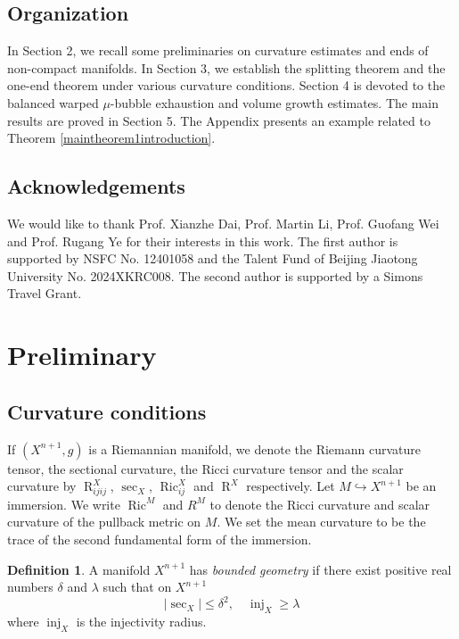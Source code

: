 \documentclass[11pt,letterpaper]{amsart}
\DeclareMathOperator{\inj}{inj}
\DeclareMathOperator{\Ric}{Ric}
\DeclareMathOperator{\R}{R}
\theoremstyle{definition}
\newtheorem{definition}[theorem]{Definition}
\theoremstyle{remark}
\numberwithin{equation}{section}
\begin{document}
\subsection{Organization}
In Section 2, we recall some preliminaries on curvature estimates and ends of non-compact manifolds. In Section 3, we establish the splitting theorem and the one-end theorem under various curvature conditions. Section 4 is devoted to the balanced warped $\mu$-bubble exhaustion and volume growth estimates. The main results are proved in Section 5. The Appendix presents an example related to Theorem \ref{maintheorem1introduction}.
\subsection{Acknowledgements}
We would like to thank Prof. Xianzhe Dai, Prof. Martin Li, Prof. Guofang Wei and Prof. Rugang Ye for their interests in this work. The first author is supported by NSFC No. 12401058 and the Talent Fund of Beijing Jiaotong University No. 2024XKRC008. The second author is supported by a Simons Travel Grant.


\section{Preliminary}
\subsection{Curvature conditions}
If $(X^{n+1},g)$ is a Riemannian manifold, we denote the Riemann curvature tensor, the sectional curvature, the Ricci curvature tensor and the scalar curvature by $\R^X_{ijij}$, $\sec_X$, $\Ric^X_{ij}$ and $\R^X$ respectively. Let $M\hookrightarrow X^{n+1}$ be an immersion. We write $\Ric^M$ and $R^M$ to denote the Ricci curvature and scalar curvature of the pullback metric on $M$. We set the mean curvature to be the trace of the second fundamental form of the immersion.
\begin{definition}
	A manifold $X^{n+1}$ has \textit{bounded geometry} if there exist positive real numbers $\delta$ and $\lambda$ such that on $X^{n+1}$
	\begin{equation*}
		|\sec_X|\leqslant \delta^2, \quad \inj_X\geqslant \lambda
	\end{equation*}
 where $\inj_X$ is the injectivity radius.
\end{definition}
\end{document}

